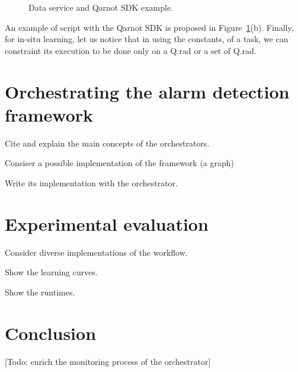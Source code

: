 \documentclass[10pt, conference, compsocconf]{IEEEtran}
\begin{document}
	\begin{figure}[ht]
	\centering
	\caption{Data service and Qarnot SDK example.} 
	\label{fig:arch}
	\end{figure}

An example of script with the Qarnot SDK is proposed in Figure~\ref{fig:arch}(b). Finally, for in-situ learning, let us notice that 
in using the constants, of a task, we can constraint its execution to be done only on a Q.rad or a set of Q.rad.


\section{Orchestrating the alarm detection framework} \label{Orchestrator}

Cite and explain the main concepts of the orchestrators.

Consiser a possible implementation of the framework (a graph)

Write its implementation with the orchestrator.

\section{Experimental evaluation} \label{Proof-of-concept}

Consider diverse implementations of the workflow.

Show the learning curves.

Show the runtimes.


\section{Conclusion} \label{Conclusion}

[Todo: enrich the monitoring process of the orchestrator]









\end{document}
